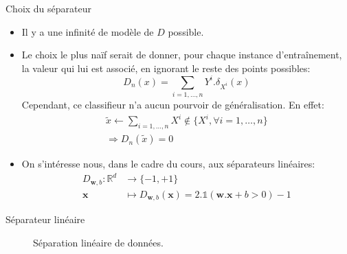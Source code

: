\documentclass[8pt]{beamer}
\begin{document}
		\begin{frame}{Choix du séparateur}
			\begin{itemize}
				\item  Il y a une infinité de modèle de $D$ possible.
				\item  Le choix le plus naïf serait de donner, pour chaque instance d'entraînement, la valeur qui lui est associé, en ignorant le reste des points possibles:
				\begin{equation*}
					D_n(x) = \sum_{i=1,\dots,n} Y^i . \delta_{X^i}(x)
				\end{equation*}
				Cependant, ce classifieur n'a aucun pourvoir de généralisation. En effet:
				\begin{gather*}
					\widetilde{x} \leftarrow \sum_{i=1,\dots,n} X^i \notin \{X^i, \forall i=1,\dots,n\} \\
					\Rightarrow D_n(\widetilde{x}) = 0
				\end{gather*}
				\item  On s'intéresse nous, dans le cadre du cours, aux séparateurs linéaires:
				\begin{align*}
					D_{\textbf{w}, b}: \mathbb{R}^d &\rightarrow \{-1, +1\} \\
					\textbf{x} &\mapsto D_{\textbf{w}, b}(\textbf{x}) = 2.\mathbb{1}(\textbf{w}.\textbf{x} + b > 0) - 1
				\end{align*}
			\end{itemize}
		\end{frame}

		\begin{frame}{Séparateur linéaire}
			\begin{figure}[H]
				{
					\caption{\label{fig::lin_separators} Séparation linéaire de données.}
				}
			\end{figure}
		\end{frame}
\end{document}
